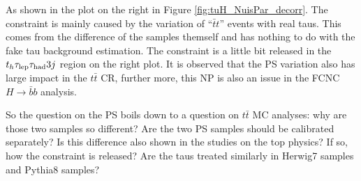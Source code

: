 As shown in the plot on the right in Figure \ref{fig:tuH_NuisPar_decorr}. The constraint is mainly caused by the variation of ``$\bar{t}t$'' events with real taus. This comes from the difference of the samples themself and has nothing to do with the fake tau background estimation. The constraint is a little bit released in the $t_h\tau_\text{lep}{}\tau_\text{had} 3j$ region on the right plot. It is observed that the PS variation also has large impact in the $t\bar{t}$ CR, further more, this NP is also an issue in the FCNC $H\to \bar{b}b$ analysis.

So the question on the PS boils down to a question on $t\bar{t}$ MC analyses: why are those two samples so different? Are the two PS samples should be calibrated separately? Is this difference also shown in the studies on the top physics? If so, how the constraint is released? Are the taus treated similarly in Herwig7 samples and Pythia8 samples? 



